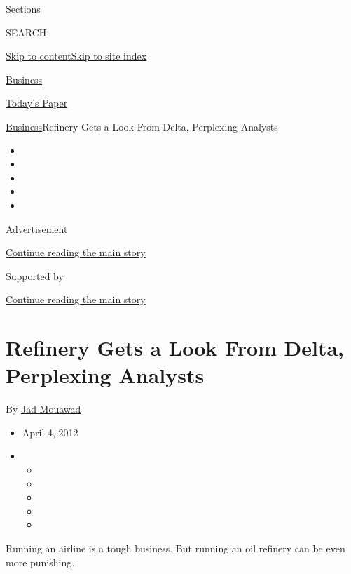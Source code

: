 Sections

SEARCH

\protect\hyperlink{site-content}{Skip to
content}\protect\hyperlink{site-index}{Skip to site index}

\href{https://www.nytimes3xbfgragh.onion/section/business}{Business}

\href{https://myaccount.nytimes3xbfgragh.onion/auth/login?response_type=cookie\&client_id=vi}{}

\href{https://www.nytimes3xbfgragh.onion/section/todayspaper}{Today's
Paper}

\href{/section/business}{Business}\textbar{}Refinery Gets a Look From
Delta, Perplexing Analysts

\begin{itemize}
\item
\item
\item
\item
\item
\end{itemize}

Advertisement

\protect\hyperlink{after-top}{Continue reading the main story}

Supported by

\protect\hyperlink{after-sponsor}{Continue reading the main story}

\hypertarget{refinery-gets-a-look-from-delta-perplexing-analysts}{%
\section{Refinery Gets a Look From Delta, Perplexing
Analysts}\label{refinery-gets-a-look-from-delta-perplexing-analysts}}

By \href{https://www.nytimes3xbfgragh.onion/by/jad-mouawad}{Jad Mouawad}

\begin{itemize}
\item
  April 4, 2012
\item
  \begin{itemize}
  \item
  \item
  \item
  \item
  \item
  \end{itemize}
\end{itemize}

Running an airline is a tough business. But running an oil refinery can
be even more punishing.

